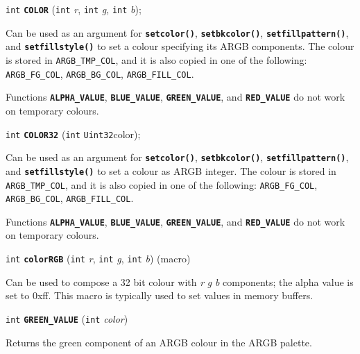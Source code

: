 \documentclass[a4paper,12pt]{article}
\newcommand{\I}{\texttt{int}}       %
\newcommand{\Ut}{\texttt{Uint32}}   %
\newcommand{\func}[1]{\textbf{\texttt{#1}}}  %
\newcommand{\A}[1]{\emph{#1}}       %
\newcommand{\T}[1]{\texttt{#1}}     %
\newenvironment{bgi}
{ %
  \begin{snugshade}
}
{ %
  \end{snugshade}
}
\begin{document}
\begin{bgi}
\I{} \func{COLOR} (\I{} \A{r}, \I{} \A{g}, \I{} \A{b});
\end{bgi}

Can be used as an argument for \func{setcolor()}, \func{setbkcolor()},
\func{setfillpattern()}, and \func{setfillstyle()} to set a colour
specifying its ARGB components. The colour is stored in
\T{ARGB\_TMP\_COL}, and it is also copied in one of the following:
\T{ARGB\_FG\_COL}, \T{ARGB\_BG\_COL}, \T{ARGB\_FILL\_COL}.

Functions \func{ALPHA\_VALUE}, \func{BLUE\_VALUE},
\func{GREEN\_VALUE}, and \func{RED\_VALUE} do not work on temporary
colours.


\label{sec:COLOR32}

\begin{bgi}
\I{} \func{COLOR32} (\I{} \Ut{color});
\end{bgi}

Can be used as an argument for \func{setcolor()}, \func{setbkcolor()},
\func{setfillpattern()}, and \func{setfillstyle()} to set a colour as
ARGB integer. The colour is stored in \T{ARGB\_TMP\_COL}, and it is
also copied in one of the following: \T{ARGB\_FG\_COL},
\T{ARGB\_BG\_COL}, \T{ARGB\_FILL\_COL}.

Functions \func{ALPHA\_VALUE}, \func{BLUE\_VALUE},
\func{GREEN\_VALUE}, and \func{RED\_VALUE} do not work on temporary
colours.


\label{sec:colorRGB}

\begin{bgi}
\I{} \func{colorRGB} (\I{} \A{r}, \I{} \A{g}, \I{} \A{b}) (macro)
\end{bgi}

Can be used to compose a 32 bit colour with \A{r} \A{g} \A{b}
components; the alpha value is set to 0xff. This macro is typically
used to set values in memory buffers.


\label{sec:GREENVALUE}

\begin{bgi}
\I{} \func{GREEN\_VALUE} (\I{} \A{color})
\end{bgi}

Returns the green component of an ARGB colour in the ARGB palette.
\end{document}
